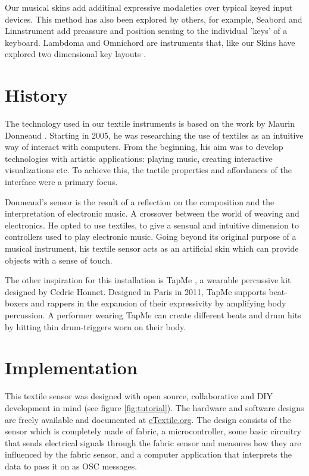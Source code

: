 \documentclass{sigchi-ext}
\begin{document}
Our musical skins add additinal expressive modaleties over typical keyed input devices. This method has also been explored by others, for example, Seabord and Linnstrument \cite{seaboard, linnstrument} add preassure and position sensing to the individual 'keys' of a keyboard. Lambdoma and Omnichord are instruments that, like our Skins have explored two dimensional key layouts \cite{lambdoma, omnichord}.


\section{History}
The technology used in our textile instruments is based on the work by Maurin Donneaud \cite{donneaud}. Starting in 2005, he was researching the use of textiles as an intuitive way of interact with computers. From the beginning, his aim was to develop technologies with artistic applications: playing music, creating interactive visualizations etc. To achieve this, the tactile properties and affordances of the interface were a primary focus.

Donneaud's sensor is the result of a reflection on the composition and the interpretation of electronic music. A crossover between the world of weaving and electronics. He opted to use textiles, to give a sensual and intuitive dimension to controllers used to play electronic music. Going beyond its original purpose of a musical instrument, his textile sensor acts as an artificial skin which can provide objects with a sense of touch.

The other inspiration for this installation is TapMe \cite{tapme}, a wearable percussive kit designed by Cedric Honnet. Designed in Paris in 2011, TapMe supports beat-boxers and rappers in the expansion of their expressivity by amplifying body percussion. A performer wearing TapMe can create different beats and drum hits by hitting thin drum-triggers worn on their body.


\section{Implementation}

This textile sensor was designed with open source, collaborative and DIY development in mind (see figure \ref{fig:tutorial}). The hardware and software designs are freely available and documented at \url{eTextile.org}. The design consists of the sensor which is completely made of fabric, a microcontroller, some basic circuitry that sends electrical signals through the fabric sensor and measures how they are influenced by the fabric sensor, and a computer application that interprets the data to pass it on as OSC messages.
\end{document}
